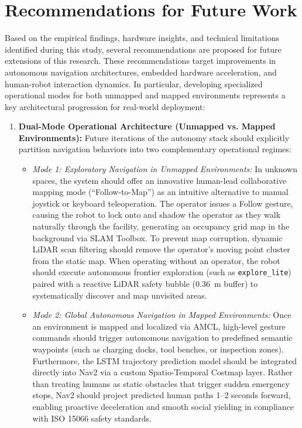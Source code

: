 \section{Recommendations for Future Work}
Based on the empirical findings, hardware insights, and technical limitations identified during this study, several recommendations are proposed for future extensions of this research. These recommendations target improvements in autonomous navigation architectures, embedded hardware acceleration, and human-robot interaction dynamics. In particular, developing specialized operational modes for both unmapped and mapped environments represents a key architectural progression for real-world deployment:

\begin{enumerate}
    \item \textbf{Dual-Mode Operational Architecture (Unmapped vs. Mapped Environments):} Future iterations of the autonomy stack should explicitly partition navigation behaviors into two complementary operational regimes:
    \begin{itemize}
        \item \textit{Mode 1: Exploratory Navigation in Unmapped Environments:} In unknown spaces, the system should offer an innovative human-lead collaborative mapping mode (``Follow-to-Map'') as an intuitive alternative to manual joystick or keyboard teleoperation. The operator issues a Follow gesture, causing the robot to lock onto and shadow the operator as they walk naturally through the facility, generating an occupancy grid map in the background via SLAM Toolbox. To prevent map corruption, dynamic LiDAR scan filtering should remove the operator's moving point cluster from the static map. When operating without an operator, the robot should execute autonomous frontier exploration (such as \texttt{explore\_lite}) paired with a reactive LiDAR safety bubble (0.36~m buffer) to systematically discover and map unvisited areas.
        \item \textit{Mode 2: Global Autonomous Navigation in Mapped Environments:} Once an environment is mapped and localized via AMCL, high-level gesture commands should trigger autonomous navigation to predefined semantic waypoints (such as charging docks, tool benches, or inspection zones). Furthermore, the LSTM trajectory prediction model should be integrated directly into Nav2 via a custom Spatio-Temporal Costmap layer. Rather than treating humans as static obstacles that trigger sudden emergency stops, Nav2 should project predicted human paths 1--2 seconds forward, enabling proactive deceleration and smooth social yielding in compliance with ISO 15066 safety standards.

\end{itemize}
\end{enumerate}
